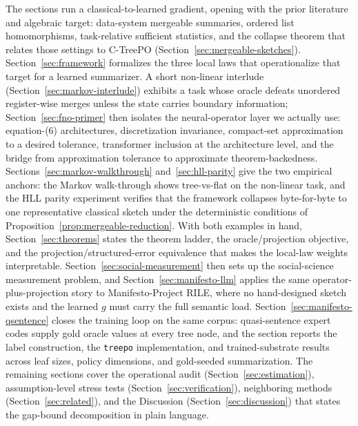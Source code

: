 The sections run a classical-to-learned gradient, opening with the prior literature and algebraic target: data-system mergeable summaries, ordered list homomorphisms, task-relative sufficient statistics, and the collapse theorem that relates those settings to C-TreePO (Section~\ref{sec:mergeable-sketches}). Section~\ref{sec:framework} formalizes the three local laws that operationalize that target for a learned summarizer. A short non-linear interlude (Section~\ref{sec:markov-interlude}) exhibits a task whose oracle defeats unordered register-wise merges unless the state carries boundary information; Section~\ref{sec:fno-primer} then isolates the neural-operator layer we actually use: equation-(6) architectures, discretization invariance, compact-set approximation to a desired tolerance, transformer inclusion at the architecture level, and the bridge from approximation tolerance to approximate theorem-backedness. Sections~\ref{sec:markov-walkthrough} and~\ref{sec:hll-parity} give the two empirical anchors: the Markov walk-through shows tree-vs-flat on the non-linear task, and the HLL parity experiment verifies that the framework collapses byte-for-byte to one representative classical sketch under the deterministic conditions of Proposition~\ref{prop:mergeable-reduction}. With both examples in hand, Section~\ref{sec:theorems} states the theorem ladder, the oracle/projection objective, and the projection/structured-error equivalence that makes the local-law weights interpretable. Section~\ref{sec:social-measurement} then sets up the social-science measurement problem, and Section~\ref{sec:manifesto-llm} applies the same operator-plus-projection story to Manifesto-Project RILE, where no hand-designed sketch exists and the learned $g$ must carry the full semantic load. Section~\ref{sec:manifesto-qsentence} closes the training loop on the same corpus: quasi-sentence expert codes supply gold oracle values at every tree node, and the section reports the label construction, the \texttt{treepo} implementation, and trained-substrate results across leaf sizes, policy dimensions, and gold-seeded summarization. The remaining sections cover the operational audit (Section~\ref{sec:estimation}), assumption-level stress tests (Section~\ref{sec:verification}), neighboring methods (Section~\ref{sec:related}), and the Discussion (Section~\ref{sec:discussion}) that states the gap-bound decomposition in plain language.
